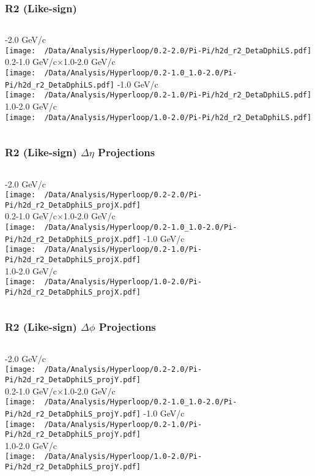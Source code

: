 \documentclass{beamer}
\begin{document}
\begin{frame}
	\frametitle{R2 (Like-sign)}
	\begin{columns}
		-2.0 GeV/c\\
		\texttt{[image: ~/Data/Analysis/Hyperloop/0.2-2.0/Pi-Pi/h2d\_r2\_DetaDphiLS.pdf]}\\0.2-1.0 GeV/c$\times$1.0-2.0 GeV/c\\
		\texttt{[image: ~/Data/Analysis/Hyperloop/0.2-1.0\_1.0-2.0/Pi-Pi/h2d\_r2\_DetaDphiLS.pdf]}
		-1.0 GeV/c\\
		\texttt{[image: ~/Data/Analysis/Hyperloop/0.2-1.0/Pi-Pi/h2d\_r2\_DetaDphiLS.pdf]}\\1.0-2.0 GeV/c\\
		\texttt{[image: ~/Data/Analysis/Hyperloop/1.0-2.0/Pi-Pi/h2d\_r2\_DetaDphiLS.pdf]}
	\end{columns}
\end{frame}
\begin{frame}
	\frametitle{R2 (Like-sign) $\Delta\eta$ Projections}
	\begin{columns}
		\column{0.5\textwidth}
		-2.0 GeV/c\\
		\texttt{[image: ~/Data/Analysis/Hyperloop/0.2-2.0/Pi-Pi/h2d\_r2\_DetaDphiLS\_projX.pdf]}\\0.2-1.0 GeV/c$\times$1.0-2.0 GeV/c\\
		\texttt{[image: ~/Data/Analysis/Hyperloop/0.2-1.0\_1.0-2.0/Pi-Pi/h2d\_r2\_DetaDphiLS\_projX.pdf]}
		\column{0.5\textwidth}
		-1.0 GeV/c\\
		\texttt{[image: ~/Data/Analysis/Hyperloop/0.2-1.0/Pi-Pi/h2d\_r2\_DetaDphiLS\_projX.pdf]}\\1.0-2.0 GeV/c\\
		\texttt{[image: ~/Data/Analysis/Hyperloop/1.0-2.0/Pi-Pi/h2d\_r2\_DetaDphiLS\_projX.pdf]}
	\end{columns}
\end{frame}
\begin{frame}
	\frametitle{R2 (Like-sign) $\Delta\phi$ Projections}
	\begin{columns}
		-2.0 GeV/c\\
		\texttt{[image: ~/Data/Analysis/Hyperloop/0.2-2.0/Pi-Pi/h2d\_r2\_DetaDphiLS\_projY.pdf]}\\0.2-1.0 GeV/c$\times$1.0-2.0 GeV/c\\
		\texttt{[image: ~/Data/Analysis/Hyperloop/0.2-1.0\_1.0-2.0/Pi-Pi/h2d\_r2\_DetaDphiLS\_projY.pdf]}
		-1.0 GeV/c\\
		\texttt{[image: ~/Data/Analysis/Hyperloop/0.2-1.0/Pi-Pi/h2d\_r2\_DetaDphiLS\_projY.pdf]}\\1.0-2.0 GeV/c\\
		\texttt{[image: ~/Data/Analysis/Hyperloop/1.0-2.0/Pi-Pi/h2d\_r2\_DetaDphiLS\_projY.pdf]}
	\end{columns}
\end{frame}
\end{document}
